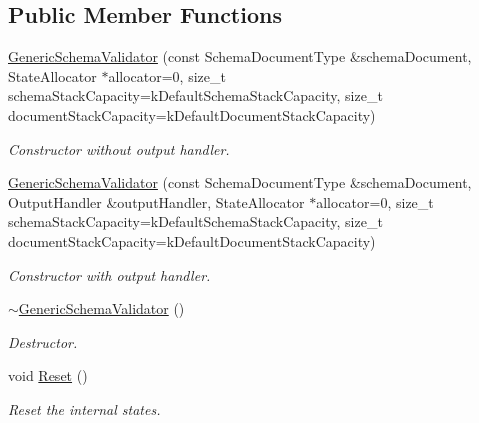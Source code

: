 \subsection*{Public Member Functions}
\begin{DoxyCompactItemize}
\item 
\hyperlink{classGenericSchemaValidator_a202ee6fdbe5ae9eab3e77a81ecdfeb6d}{Generic\+Schema\+Validator} (const Schema\+Document\+Type \&schema\+Document, State\+Allocator $\ast$allocator=0, size\+\_\+t schema\+Stack\+Capacity=k\+Default\+Schema\+Stack\+Capacity, size\+\_\+t document\+Stack\+Capacity=k\+Default\+Document\+Stack\+Capacity)
\begin{DoxyCompactList}\small\item\em Constructor without output handler. \end{DoxyCompactList}\item 
\hyperlink{classGenericSchemaValidator_ac2027be8ca55b01cd6f38b45f4e233b4}{Generic\+Schema\+Validator} (const Schema\+Document\+Type \&schema\+Document, Output\+Handler \&output\+Handler, State\+Allocator $\ast$allocator=0, size\+\_\+t schema\+Stack\+Capacity=k\+Default\+Schema\+Stack\+Capacity, size\+\_\+t document\+Stack\+Capacity=k\+Default\+Document\+Stack\+Capacity)
\begin{DoxyCompactList}\small\item\em Constructor with output handler. \end{DoxyCompactList}\item 
\mbox{\label{classGenericSchemaValidator_a3eab83d483a50efb0c0390adf3291963}} 
\hyperlink{classGenericSchemaValidator_a3eab83d483a50efb0c0390adf3291963}{$\sim$\+Generic\+Schema\+Validator} ()
\begin{DoxyCompactList}\small\item\em Destructor. \end{DoxyCompactList}\item 
\mbox{\label{classGenericSchemaValidator_a49efbbe098cb77728be3d48cafed17e4}} 
void \hyperlink{classGenericSchemaValidator_a49efbbe098cb77728be3d48cafed17e4}{Reset} ()
\begin{DoxyCompactList}\small\item\em Reset the internal states. \end{DoxyCompactList}\item 
\mbox{\label{classGenericSchemaValidator_a8ebda4da3d8b1fc41e57f15dd62e8f19}} 

\end{DoxyCompactItemize}
